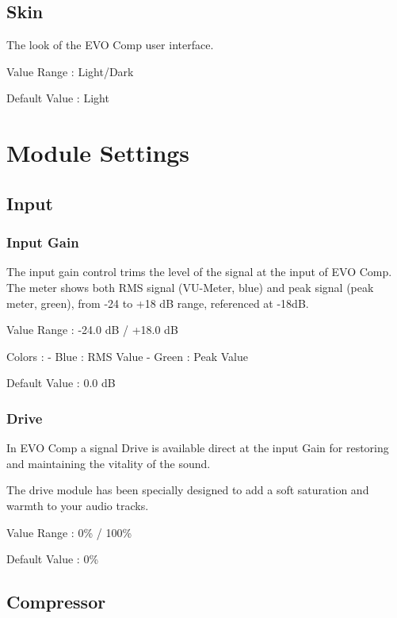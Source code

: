 \documentclass[
  letterpaper,
  DIV=11,
  numbers=noendperiod]{scrreport}
\begin{document}
\hypertarget{skin}{%
\section{Skin}\label{skin}}

The look of the EVO Comp user interface.

Value Range : Light/Dark

Default Value : Light


\hypertarget{module-settings}{%
\chapter{Module Settings}\label{module-settings}}

\hypertarget{input}{%
\section{Input}\label{input}}

\hypertarget{input-gain}{%
\subsection{Input Gain}\label{input-gain}}

The input gain control trims the level of the signal at the input of EVO
Comp. The meter shows both RMS signal (VU-Meter, blue) and peak signal
(peak meter, green), from -24 to +18 dB range, referenced at -18dB.

Value Range : -24.0 dB / +18.0 dB

Colors : - Blue : RMS Value - Green : Peak Value

Default Value : 0.0 dB

\hypertarget{drive}{%
\subsection{Drive}\label{drive}}

In EVO Comp a signal Drive is available direct at the input Gain for
restoring and maintaining the vitality of the sound.

The drive module has been specially designed to add a soft saturation
and warmth to your audio tracks.

Value Range : 0\% / 100\%

Default Value : 0\%

\hypertarget{compressor}{%
\section{Compressor}\label{compressor}}
\end{document}
